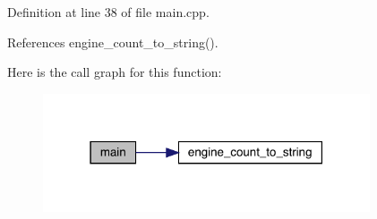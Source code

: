 Definition at line 38 of file main.\+cpp.



References engine\+\_\+count\+\_\+to\+\_\+string().

Here is the call graph for this function\+:
\nopagebreak
\begin{figure}[H]
\begin{center}
\leavevmode
\includegraphics[width=274pt]{hand-tracking_2src_2main_8cpp_a0ddf1224851353fc92bfbff6f499fa97_cgraph}
\end{center}
\end{figure}
